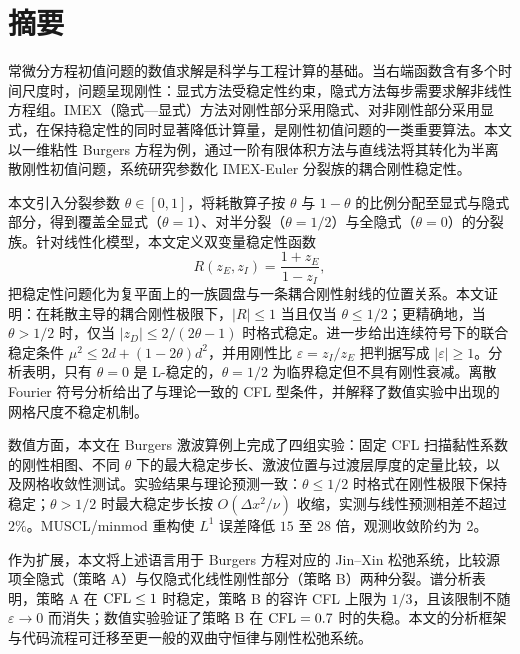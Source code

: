 \chapter*{\texorpdfstring{摘\quad 要}{摘要}}

\begingroup
\linespread{1.28}\selectfont

常微分方程初值问题的数值求解是科学与工程计算的基础。当右端函数含有多个时间尺度时，问题呈现刚性：显式方法受稳定性约束，隐式方法每步需要求解非线性方程组。IMEX（隐式—显式）方法对刚性部分采用隐式、对非刚性部分采用显式，在保持稳定性的同时显著降低计算量，是刚性初值问题的一类重要算法。本文以一维粘性 Burgers 方程为例，通过一阶有限体积方法与直线法将其转化为半离散刚性初值问题，系统研究参数化 IMEX-Euler 分裂族的耦合刚性稳定性。

本文引入分裂参数 $\theta\in[0,1]$，将耗散算子按 $\theta$ 与 $1-\theta$ 的比例分配至显式与隐式部分，得到覆盖全显式（$\theta=1$）、对半分裂（$\theta=1/2$）与全隐式（$\theta=0$）的分裂族。针对线性化模型，本文定义双变量稳定性函数
\[
  R(z_E,z_I)=\frac{1+z_E}{1-z_I},
\]
把稳定性问题化为复平面上的一族圆盘与一条耦合刚性射线的位置关系。本文证明：在耗散主导的耦合刚性极限下，$|R|\le 1$ 当且仅当 $\theta\le 1/2$；更精确地，当 $\theta>1/2$ 时，仅当 $|z_D|\le 2/(2\theta-1)$ 时格式稳定。进一步给出连续符号下的联合稳定条件 $\mu^2\le 2d+(1-2\theta)d^2$，并用刚性比 $\varepsilon=z_I/z_E$ 把判据写成 $|\varepsilon|\ge1$。分析表明，只有 $\theta=0$ 是 L-稳定的，$\theta=1/2$ 为临界稳定但不具有刚性衰减。离散 Fourier 符号分析给出了与理论一致的 CFL 型条件，并解释了数值实验中出现的网格尺度不稳定机制。

数值方面，本文在 Burgers 激波算例上完成了四组实验：固定 CFL 扫描黏性系数的刚性相图、不同 $\theta$ 下的最大稳定步长、激波位置与过渡层厚度的定量比较，以及网格收敛性测试。实验结果与理论预测一致：$\theta\le 1/2$ 时格式在刚性极限下保持稳定；$\theta>1/2$ 时最大稳定步长按 $O(\Delta x^2/\nu)$ 收缩，实测与线性预测相差不超过 $2\%$。MUSCL/minmod 重构使 $L^1$ 误差降低 $15$ 至 $28$ 倍，观测收敛阶约为 $2$。

作为扩展，本文将上述语言用于 Burgers 方程对应的 Jin--Xin 松弛系统，比较源项全隐式（策略 A）与仅隐式化线性刚性部分（策略 B）两种分裂。谱分析表明，策略 A 在 $\mathrm{CFL}\le 1$ 时稳定，策略 B 的容许 CFL 上限为 $1/3$，且该限制不随 $\varepsilon\to 0$ 而消失；数值实验验证了策略 B 在 $\mathrm{CFL}=0.7$ 时的失稳。本文的分析框架与代码流程可迁移至更一般的双曲守恒律与刚性松弛系统。

